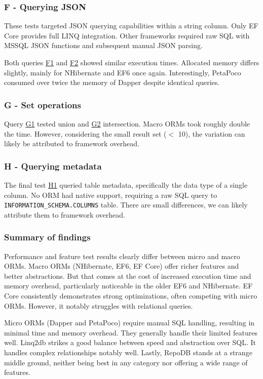 \subsubsection{F - Querying JSON}
These tests targeted JSON querying capabilities within a string column. Only EF Core provides full LINQ integration. Other frameworks required raw SQL with MSSQL JSON functions and subsequent manual JSON parsing.

Both queries \hyperref[query:f1]{F1} and \hyperref[query:f2]{F2} showed similar execution times. Allocated memory differs slightly, mainly for NHibernate and EF6 once again. Interestingly, PetaPoco consumed over twice the memory of Dapper despite identical queries.

\subsubsection{G - Set operations}
Query \hyperref[query:g1]{G1} tested union and \hyperref[query:g2]{G2} intersection. Macro ORMs took roughly double the time. However, considering the small result set ($<$ 10), the variation can likely be attributed to framework overhead.

\subsubsection{H - Querying metadata}
The final test \hyperref[query:h1]{H1} queried table metadata, specifically the data type of a single column. No ORM had native support, requiring a raw SQL query to \texttt{INFORMATION\_SCHEMA.COLUMNS} table. There are small differences, we can likely attribute them to framework overhead.

\subsubsection{Summary of findings}
Performance and feature test results clearly differ between micro and macro ORMs. Macro ORMs (NHibernate, EF6, EF Core) offer richer features and better abstractions. But that comes at the cost of increased execution time and memory overhead, particularly noticeable in the older EF6 and NHibernate. EF Core consistently demonstrates strong optimizations, often competing with micro ORMs. However, it notably struggles with relational queries. 

Micro ORMs (Dapper and PetaPoco) require manual SQL handling, resulting in minimal time and memory overhead. They generally handle their limited features well. Linq2db strikes a good balance between speed and abstraction over SQL. It handles complex relationships notably well. Lastly, RepoDB stands at a strange middle ground, neither being best in any category nor offering a wide range of features.

